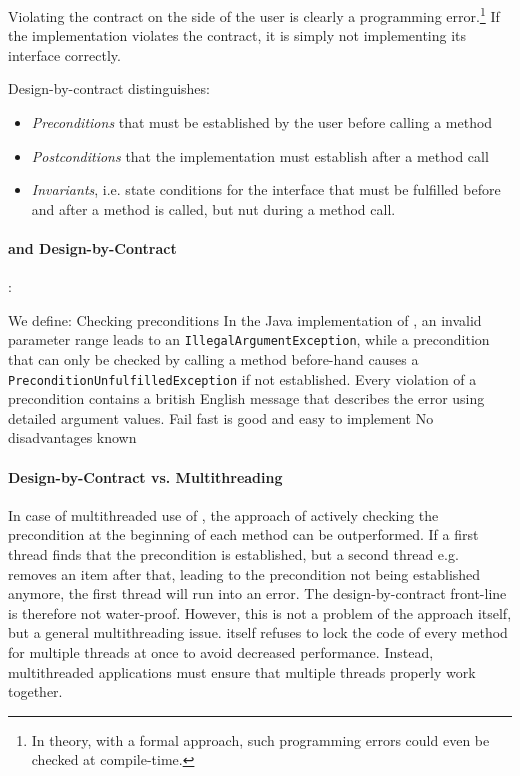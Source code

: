 Violating the contract on the side of the user is clearly a programming error.\footnote{In theory, with a formal approach, such programming errors could even be checked at compile-time.} If the implementation violates the contract, it is simply not implementing its interface correctly.

Design-by-contract distinguishes:
\begin{itemize}
\item \emph{Preconditions} that must be established by the user before calling a method
\item \emph{Postconditions} that the implementation must establish after a method call
\item \emph{Invariants}, i.e. state conditions for the interface that must be fulfilled before and after a method is called, but nut during a method call.
\end{itemize}

\paragraph{\LibName{} and Design-by-Contract}:
\label{sec:LibNameDesignByContract}

We define: 
{%
Checking preconditions
}
{%
In the Java implementation of \LibName{}, an invalid parameter range leads to an \texttt{IllegalArgumentException}, while a precondition that can only be checked by calling a method before-hand causes a \texttt{PreconditionUnfulfilledException} if not established. Every violation of a precondition contains a british English message that describes the error using detailed argument values.
}
{%
Fail fast is good and easy to implement
}
{%
No disadvantages known
}

\paragraph{Design-by-Contract vs. Multithreading}
\label{sec:DbcMultithreading}

In case of multithreaded use of \LibName{}, the approach of actively checking the precondition at the beginning of each method can be outperformed. If a first thread finds that the precondition is established, but a second thread e.g. removes an item after that, leading to the precondition not being established anymore, the first thread will run into an error. The design-by-contract front-line is therefore not water-proof. However, this is not a problem of the approach itself, but a general multithreading issue. \LibName{} itself refuses to lock the code of every method for multiple threads at once to avoid decreased performance. Instead, multithreaded applications must ensure that multiple threads properly work together.

